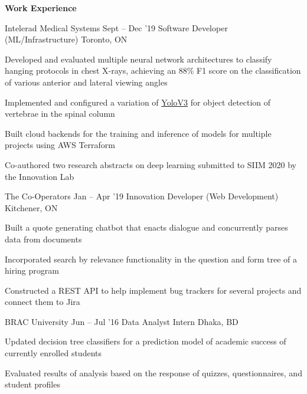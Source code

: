 \documentclass{resume} %
\begin{document}
\begin{rSection}{\textbf{Work Experience}}

  \begin{rSubsection}{Intelerad Medical Systems}
   {Sept -- Dec '19}
   		{Software Developer (ML/Infrastructure)}
		{Toronto, ON}
		\item Developed and evaluated multiple neural network architectures to classify hanging protocols in chest X-rays, achieving an 88\% F1 score on the classification of various anterior and lateral viewing angles
		\item Implemented and configured a variation of {\underline{\href{https://pjreddie.com/media/files/papers/YOLOv3.pdf}{YoloV3}}} for object detection of vertebrae in the spinal column
		\item Built cloud backends for the training and inference of models for multiple projects using AWS Terraform
		\item Co-authored two research abstracts on  deep learning submitted to SIIM 2020 by the Innovation Lab
	
  \end{rSubsection}

  \begin{rSubsection}{The Co-Operators}
    {Jan -- Apr '19}
         {Innovation Developer (Web Development)}
         {Kitchener, ON}
       \item Built a quote generating chatbot that enacts dialogue and concurrently parses data from documents
       \item Incorporated search by relevance functionality in the question and form tree of a hiring program
        \item Constructed a REST API to help implement bug trackers for several projects and connect them to Jira

  \end{rSubsection}

	\begin{rSubsection}{BRAC University}
		{Jun -- Jul '16}
		{Data Analyst Intern}
		{Dhaka, BD}
		\item Updated decision tree classifiers for a prediction model of academic success of currently enrolled students
		\item Evaluated results of analysis based on the response of quizzes, questionnaires, and student profiles
	\end{rSubsection}
  
\end{rSection} 
\end{document}
